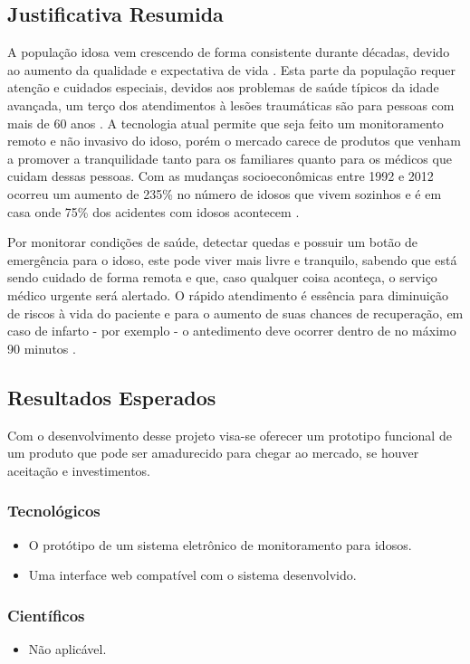 \documentclass[a4paper]{article}
\begin{document}
\subsection{Justificativa Resumida}
A população idosa vem crescendo de forma consistente durante décadas, devido ao aumento da qualidade e expectativa de vida \cite{KUCHEMANN2012}. Esta parte da população requer atenção e cuidados especiais, devidos aos problemas de saúde típicos da idade avançada, um terço dos atendimentos à lesões traumáticas são para pessoas com mais de 60 anos \cite{CALERTA}. A tecnologia atual permite que seja feito um monitoramento remoto e não invasivo do idoso, porém o mercado carece de produtos que venham a promover a tranquilidade tanto para os familiares quanto para os médicos que cuidam dessas pessoas. Com as mudanças socioeconômicas entre 1992 e 2012 ocorreu um aumento de 235\% no número de idosos que vivem sozinhos \cite{FOLHA} e é em casa onde 75\% dos acidentes com idosos acontecem \cite{ACRIT}.

Por monitorar condições de saúde, detectar quedas e possuir um botão de emergência para o idoso, este pode viver mais livre e tranquilo, sabendo que está sendo cuidado de forma remota e que, caso qualquer coisa aconteça, o serviço médico urgente será alertado. O rápido atendimento é essência para diminuição de riscos à vida do paciente e para o aumento de suas chances de recuperação, em caso de infarto - por exemplo - o antedimento deve ocorrer dentro de no máximo 90 minutos \cite{CALERTA}.


\subsection{Resultados Esperados}
Com o desenvolvimento desse projeto visa-se oferecer um prototipo funcional de um produto que pode ser amadurecido para chegar ao mercado, se houver aceitação e investimentos. 

\subsubsection{Tecnológicos}
\begin{itemize}
\item O protótipo de um sistema eletrônico de monitoramento para idosos.
\item Uma interface web compatível com o sistema desenvolvido.
\end{itemize}

\subsubsection{Científicos}
\begin{itemize}
\item Não aplicável.
\end{itemize}
\end{document}
